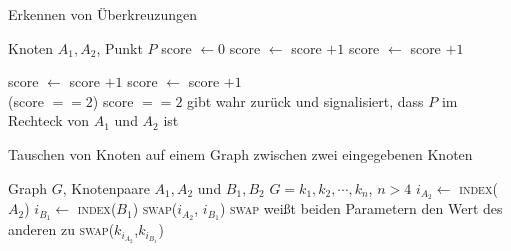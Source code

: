 \begin{algorithm}
    \caption{Erkennen von Überkreuzungen}
    \label{alg:check-point-in-rect}
    \begin{algorithmic}[1]
        \Require Knoten $A_1,A_2$, Punkt $P$
        \State score $\gets 0$
                \State score $\gets$ score $+ 1$
            \EndIf
        \Else
                \State score $\gets$ score $+ 1$
            \EndIf
        \EndIf

                \State score $\gets$ score $+ 1$
            \EndIf
        \Else
                \State score $\gets$ score $+ 1$
            \EndIf
        \EndIf\\
        \Return (score $== 2$)
        \Comment score $==2$ gibt wahr zurück und signalisiert, dass $P$ im Rechteck von $A_1$ und $A_2$ ist
    \end{algorithmic}
\end{algorithm}

\begin{algorithm}
    \caption{Tauschen von Knoten auf einem Graph zwischen zwei eingegebenen Knoten}
    \label{alg:swap-nodes-inbetween}
    \begin{algorithmic}[1]
        \Require Graph $G$, Knotenpaare $A_1,A_2$ und $B_1,B_2$
        \Require $G=k_1,k_2,\cdots,k_n$, $n>4$
        \State $i_{A_2} \gets$ \textsc{index}($A_2$)
        \State $i_{B_1} \gets$ \textsc{index}($B_1$)
            \State \textsc{swap}($i_{A_2}$, $i_{B_1}$) 
            \Comment \textsc{swap} weißt beiden Parametern den Wert des anderen zu
        \EndIf
            \State \textsc{swap}($k_{i_{A_2}}$,$k_{i_{B_1}}$)
        \EndWhile
    \end{algorithmic}
\end{algorithm}